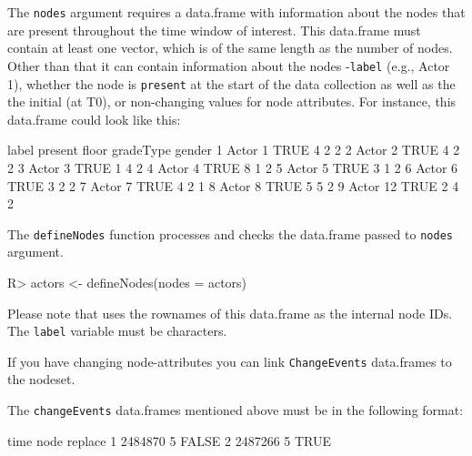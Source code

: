 \documentclass[article]{jss}
\begin{document}
The \texttt{nodes} argument requires a data.frame with information about the nodes that are present throughout the time window of interest. This data.frame must contain at least one vector, which is of the same length as the number of nodes. Other than that it can contain information about the nodes -\texttt{label} (e.g., Actor 1), whether the node is \texttt{present} at the start of the data collection as well as the the initial (at T0), or non-changing values for node attributes. For instance, this data.frame could look like this:

%
\begin{Schunk}
\begin{Soutput}
     label present floor gradeType gender
1  Actor 1    TRUE     4         2      2
2  Actor 2    TRUE     4         2      2
3  Actor 3    TRUE     1         4      2
4  Actor 4    TRUE     8         1      2
5  Actor 5    TRUE     3         1      2
6  Actor 6    TRUE     3         2      2
7  Actor 7    TRUE     4         2      1
8  Actor 8    TRUE     5         5      2
9 Actor 12    TRUE     2         4      2
\end{Soutput}
\end{Schunk}
%

The \texttt{defineNodes} function processes and checks the data.frame passed to \texttt{nodes} argument.
%
\begin{Schunk}
\begin{Sinput}
R> actors <- defineNodes(nodes = actors)  
\end{Sinput}
\end{Schunk}
%


\begin{leftbar}
Please note that  uses the rownames of this data.frame as the internal node IDs. The \texttt{label} variable must be characters.
\end{leftbar}

\newline If you have changing node-attributes you can link \texttt{ChangeEvents} data.frames to the nodeset.  

\newline The \texttt{changeEvents} data.frames mentioned above must be in the following format:
%
\begin{Schunk}
\begin{Soutput}
     time node replace
1 2484870    5   FALSE
2 2487266    5    TRUE
\end{Soutput}
\end{Schunk}
%
\end{document}
